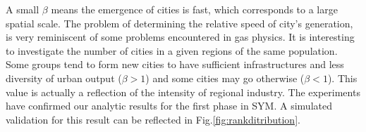 \documentclass[reprint,unsortedaddress,amsmath,amssymb,aps,prl,showkeys]{revtex4-2}
\begin{document}
A small $\beta$ means the emergence of cities is fast, which corresponds to a large spatial scale. The problem of determining the relative speed of city's generation, is very reminiscent of some problems encountered in gas physics. It is interesting to investigate the number of cities in a given regions of the same population. Some groups tend to form new cities to have sufficient infrastructures and less diversity of urban output ($\beta > 1$) and some cities may go otherwise ($\beta< 1$). This value is actually a reflection of the intensity of regional industry. The experiments have confirmed our analytic results for the first phase in SYM. A simulated validation for this result can be reflected in Fig.\@\ref{fig:rankditribution}. 
\begin{figure}[t]
	\centering
\end{figure}
\end{document}

